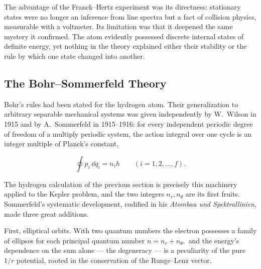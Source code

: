 The advantage of the Franck--Hertz experiment was its directness: stationary states were no longer an inference from line spectra but a fact of collision physics, measurable with a voltmeter. Its limitation was that it deepened the same mystery it confirmed. The atom evidently possessed discrete internal states of definite energy, yet nothing in the theory explained either their stability or the rule by which one state changed into another.

\subsection{The Bohr--Sommerfeld Theory}
Bohr's rules had been stated for the hydrogen atom. Their generalization to arbitrary separable mechanical systems was given independently by W.~Wilson in 1915 and by A.~Sommerfeld in 1915--1916: for every independent periodic degree of freedom of a multiply periodic system, the action integral over one cycle is an integer multiple of Planck's constant,
\begin{linenomath}
    \begin{equation}
        \oint p_i\,\dd q_i=n_i h
        \qquad (i=1,2,\dots,f).
    \end{equation}
\end{linenomath}
The hydrogen calculation of the previous section is precisely this machinery applied to the Kepler problem, and the two integers $n_r,n_\theta$ are its first fruits. Sommerfeld's systematic development, codified in his \emph{Atombau und Spektrallinien}, made three great additions.

First, elliptical orbits. With two quantum numbers the electron possesses a family of ellipses for each principal quantum number $n=n_r+n_\theta,$ and the energy's dependence on the sum alone --- the degeneracy --- is a peculiarity of the pure $1/r$ potential, rooted in the conservation of the Runge--Lenz vector.


